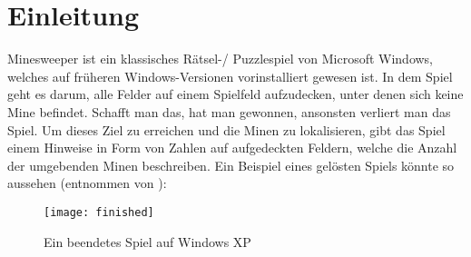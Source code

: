 %
\graphicspath{{chapters/images/}}
\section{Einleitung}
Minesweeper ist ein klassisches Rätsel-/ Puzzlespiel von Microsoft Windows, welches auf früheren Windows-Versionen
vorinstalliert gewesen ist. In dem Spiel geht es darum, alle Felder auf einem Spielfeld aufzudecken, unter denen
sich keine Mine befindet. Schafft man das, hat man gewonnen, ansonsten verliert man das Spiel. Um dieses Ziel zu
erreichen und die Minen zu lokalisieren, gibt das Spiel einem Hinweise in Form von Zahlen auf aufgedeckten
Feldern, welche die Anzahl der umgebenden Minen beschreiben. Ein Beispiel eines gelösten Spiels könnte so aussehen (entnommen von \cite{MS}):

\begin{figure}[!htb]
    \centering
    \texttt{[image: finished]}
    \caption{Ein beendetes Spiel auf Windows XP}\label{finished}
\end{figure}